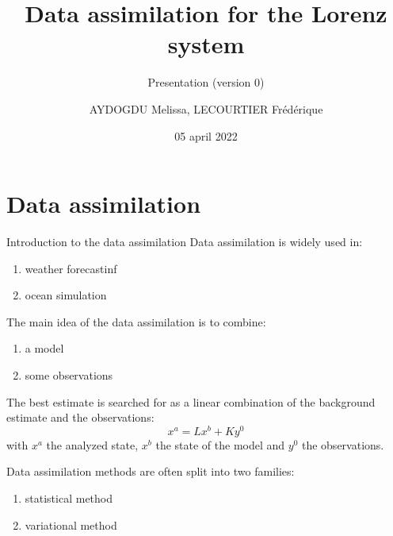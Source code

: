 \documentclass[10pt,xcolor={table,dvipsnames},t]{beamer}
\title[Lorenz]{Data assimilation for the Lorenz system}
\subtitle{Presentation (version 0)}
\author[name]{AYDOGDU Melissa, LECOURTIER Frédérique}
\institute{\large Strasbourg University}
\date{05 april 2022}
\begin{document}
	
	\begin{frame}
		\titlepage
	\end{frame}
	
	\AtBeginSection[]{
		\begin{frame}
			\vfill
			\centering
			\begin{beamercolorbox}[sep=5pt,shadow=true,rounded=true]{subtitle}
				\usebeamerfont{title}\insertsectionhead\par%
			\end{beamercolorbox}
			\vfill
		\end{frame}
	}


\section{Data assimilation }
	\begin{frame}{Introduction to the data assimilation}
	    Data assimilation is widely used in:
	    \begin{enumerate}[\textbullet]
			\item weather forecastinf
			\item ocean simulation
	    \end{enumerate}	 
    	The main idea of the data assimilation is to combine:
	    \begin{enumerate}[\textbullet]
			\item a model
			\item some observations
	    \end{enumerate}	 
	    The best estimate is searched for as a linear combination of the background estimate and the observations:
	    $$x^a=Lx^b+Ky^0$$
	    with $x^a$ the analyzed state, $x^b$ the state of the model and $y^0$ the observations.
	\end{frame}
	\begin{frame}
	    Data assimilation methods are often split into two families:
	    \begin{enumerate}[\textbullet]
			\item statistical method
			\item variational method
    	\end{enumerate}
	\end{frame}
\end{document}
